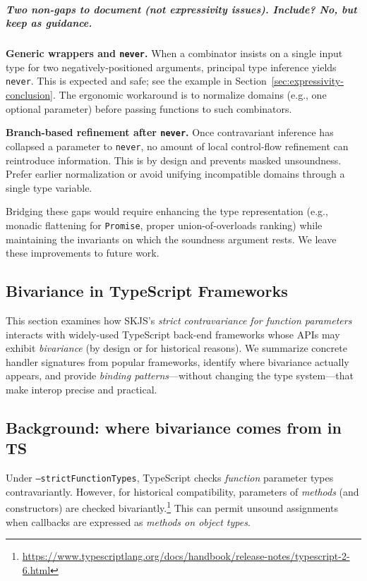 \documentclass[11pt]{article}
\begin{document}
\subparagraph{Two non-gaps to document (not expressivity issues). \;Include? \emph{No}, but keep as guidance.}
\textbf{Generic wrappers and \texttt{never}.} When a combinator insists on a single input type for two negatively-positioned arguments, principal type inference yields \texttt{never}. This is expected and safe; see the example in Section~\ref{sec:expressivity-conclusion}. The ergonomic workaround is to normalize domains (e.g., one optional parameter) before passing functions to such combinators.

\textbf{Branch-based refinement after \texttt{never}.} Once contravariant inference has collapsed a parameter to \texttt{never}, no amount of local control-flow refinement can reintroduce information. This is by design and prevents masked unsoundness. Prefer earlier normalization or avoid unifying incompatible domains through a single type variable.


Bridging these gaps would require enhancing the type representation (e.g., monadic flattening for \texttt{Promise}, proper union-of-overloads ranking) while maintaining the invariants on which the soundness argument rests. We leave these improvements to future work.

\subsection{Bivariance in TypeScript Frameworks}

This section examines how SKJS's \emph{strict contravariance for function parameters} interacts with widely-used TypeScript back-end frameworks whose APIs may exhibit \emph{bivariance} (by design or for historical reasons). We summarize concrete handler signatures from popular frameworks, identify where bivariance actually appears, and provide \emph{binding patterns}---without changing the type system---that make interop precise and practical.

\subsection{Background: where bivariance comes from in TS}
Under \texttt{--strictFunctionTypes}, TypeScript checks \emph{function} parameter types contravariantly. However, for historical compatibility, parameters of \emph{methods} (and constructors) are checked bivariantly.\footnote{\url{https://www.typescriptlang.org/docs/handbook/release-notes/typescript-2-6.html}} This can permit unsound assignments when callbacks are expressed as \emph{methods on object types}.
\end{document}
